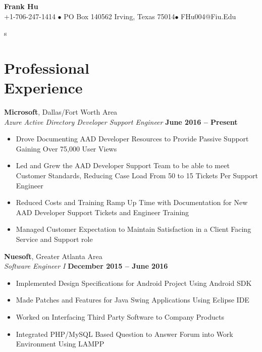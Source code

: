 \documentclass[margin,line]{resume}
\begin{document}
	{\centering \LARGE{\textbf{Frank Hu}}}
	\\
	\normalsize
	+1-706-247-1414 $\bullet$ PO Box 140562 Irving, Texas 75014$\bullet$ FHu004@Fiu.Edu
	
	\begin{resume}s
	
		
	\section{\mysidestyle Professional\\Experience}
	
	\textbf{Microsoft}, Dallas/Fort Worth Area \vspace{1mm}\\\vspace{1mm}
	\textsl{Azure Active Directory Developer Support Engineer} \hfill \textbf{June 2016 -- Present}
	\begin{itemize}
		 \item Drove Documenting AAD Developer Resources to Provide Passive Support Gaining Over 75,000 User Views	
		 \item Led and Grew the AAD Developer Support Team to be able to meet Customer Standards, Reducing Case Load From 50 to 15 Tickets Per Support Engineer 
		 \item Reduced Costs and Training Ramp Up Time with Documentation for New AAD Developer Support Tickets and Engineer Training 
		\item Managed Customer Expectation to Maintain Satisfaction in a Client
		Facing Service and Support role
	
	\end{itemize}

	\textbf{Nuesoft}, Greater Atlanta Area \vspace{1mm}\\\vspace{1mm}%
	\textsl{Software Engineer I} \hfill \textbf{December 2015 -- June 2016}
	\begin{itemize}
	 	\item Implemented Design Specifications for Android Project Using Android SDK
	 	\item Made Patches and Features for Java Swing Applications Using Eclipse IDE 
	 	\item Worked on Interfacing Third Party Software to Company Products
	 	\item Integrated PHP/MySQL Based Question to Answer Forum into Work Environment Using LAMPP
	\end{itemize}
	

\end{resume}
\end{document}
